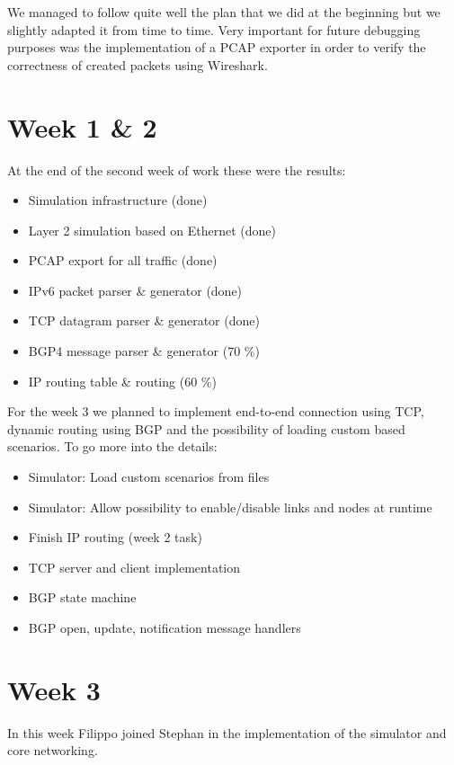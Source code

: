 We managed to follow quite well the plan that we did at the beginning but we slightly
adapted it from time to time.
Very important for future debugging purposes was the implementation of a PCAP exporter
in order to verify the correctness of created packets using Wireshark.

\section{Week 1 \& 2}
At the end of the second week of work these were the results:

\begin{itemize}
    \item Simulation infrastructure (done)
    \item Layer 2 simulation based on Ethernet (done)
    \item PCAP export for all traffic (done)
    \item IPv6 packet parser \& generator (done)
    \item TCP datagram parser \& generator (done)
    \item BGP4 message parser \& generator (70 \%)
    \item IP routing table \& routing (60 \%)
\end{itemize}

For the week 3 we planned to implement end-to-end connection using TCP, dynamic routing
using BGP and the possibility of loading custom based scenarios.
To go more into the details:

\begin{itemize}
    \item Simulator: Load custom scenarios from files
    \item Simulator: Allow possibility to enable/disable links and nodes at runtime
    \item Finish IP routing (week 2 task)
    \item TCP server and client implementation
    \item BGP state machine
    \item BGP open, update, notification message handlers
\end{itemize}

\section{Week 3}
In this week Filippo joined Stephan in the implementation of the simulator and
core networking.

